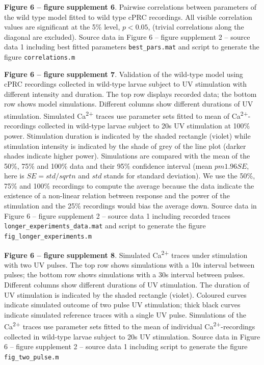 \documentclass[
  11pt,
  letterpaper,
  DIV=11,
  numbers=noendperiod]{scrartcl}
\begin{document}
\textbf{Figure 6 -- figure supplement 6}. Pairwise correlations between
parameters of the wild type model fitted to wild type cPRC recordings.
All visible correlation values are significant at the 5\% level,
\(p < 0.05\), (trivial correlations along the diagonal are excluded).
Source data in Figure 6 -- figure supplement 2 -- source data 1
including best fitted parameters \texttt{best\_pars.mat} and script to
generate the figure \texttt{correlations.m}

\textbf{Figure 6 -- figure supplement 7}. Validation of the wild-type
model using cPRC recordings collected in wild-type larvae subject to UV
stimulation with different intensity and duration. The top row displays
recorded data; the bottom row shows model simulations. Different columns
show different durations of UV stimulation. Simulated
Ca\textsuperscript{2+} traces use parameter sets fitted to mean of
Ca\textsuperscript{2+}-recordings collected in wild-type larvae subject
to 20s UV stimulation at 100\% power. Stimulation duration is indicated
by the shaded rectangle (violet) while stimulation intensity is
indicated by the shade of grey of the line plot (darker shades indicate
higher power). Simulations are compared with the mean of the 50\%, 75\%
and 100\% data and their 95\% confidence interval (mean \(pm 1.96 SE\),
here is \(SE=std/sqrt{n}\) and \(std\) stands for standard deviation).
We use the 50\%, 75\% and 100\% recordings to compute the average
because the data indicate the existence of a non-linear relation between
response and the power of the stimulation and the 25\% recordings would
bias the average down. Source data in Figure 6 -- figure supplement 2 --
source data 1 including recorded traces
\texttt{longer\_experiments\_data.mat} and script to generate the figure
\texttt{fig\_longer\_experiments.m}

\textbf{Figure 6 -- figure supplement 8}. Simulated
Ca\textsuperscript{2+} traces under stimulation with two UV pulses. The
top row shows simulations with a 10s interval between pulses; the bottom
row shows simulations with a 30s interval between pulses. Different
columns show different durations of UV stimulation. The duration of UV
stimulation is indicated by the shaded rectangle (violet). Coloured
curves indicate simulated outcome of two pulse UV stimulation; thick
black curves indicate simulated reference traces with a single UV pulse.
Simulations of the Ca\textsuperscript{2+} traces use parameter sets
fitted to the mean of individual Ca\textsuperscript{2+}-recordings
collected in wild-type larvae subject to 20s UV stimulation. Source data
in Figure 6 -- figure supplement 2 -- source data 1 including script to
generate the figure \texttt{fig\_two\_pulse.m}
\end{document}
